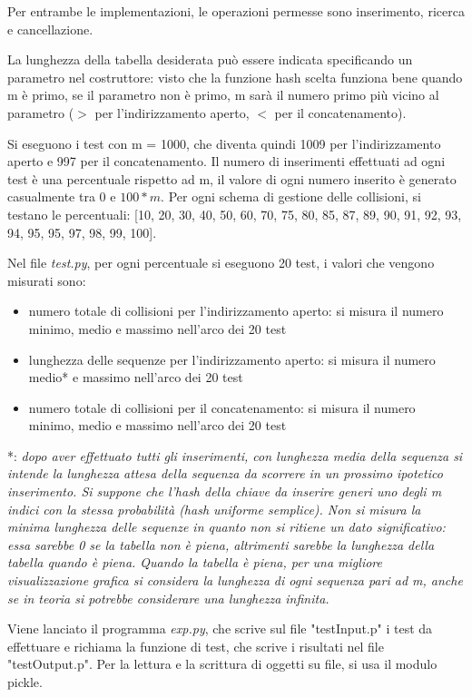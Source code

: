 \documentclass[]{article}
\begin{document}
Per entrambe le implementazioni, le operazioni permesse sono inserimento, ricerca e cancellazione.

La lunghezza della tabella desiderata può essere indicata specificando un parametro nel costruttore: visto che la funzione hash scelta funziona bene quando m è primo, se il parametro non è primo, m sarà il numero primo più vicino al parametro ($>$ per l'indirizzamento aperto, $<$ per il concatenamento).

Si eseguono i test con m = 1000, che diventa quindi 1009 per l'indirizzamento aperto e 997 per il concatenamento.
Il numero di inserimenti effettuati ad ogni test è una percentuale rispetto ad m, il valore di ogni numero inserito è generato casualmente tra $0$ e $100*m$.
Per ogni schema di gestione delle collisioni, si testano le percentuali: [10, 20, 30, 40, 50, 60, 70, 75, 80, 85, 87, 89, 90, 91, 92, 93, 94, 95, 95, 97, 98, 99, 100].

Nel file \textit{test.py}, per ogni percentuale si eseguono 20 test, i valori che vengono misurati sono:
\begin{itemize}
\item numero totale di collisioni per l'indirizzamento aperto: si misura il numero minimo, medio e massimo nell'arco dei 20 test
\item lunghezza delle sequenze per l'indirizzamento aperto: si misura il numero medio* e massimo nell'arco dei 20 test
\item numero totale di collisioni per il concatenamento: si misura il numero minimo, medio e massimo nell'arco dei 20 test
\end{itemize}

*: \textit{dopo aver effettuato tutti gli inserimenti, con lunghezza media della sequenza si intende la lunghezza attesa della sequenza da scorrere in un prossimo ipotetico inserimento. Si suppone che l'hash della chiave da inserire generi uno degli m indici con la stessa probabilità (hash uniforme semplice). Non si misura la minima lunghezza delle sequenze in quanto non si ritiene un dato significativo: essa sarebbe 0 se la tabella non è piena, altrimenti sarebbe la lunghezza della tabella quando è piena. Quando la tabella è piena, per una migliore visualizzazione grafica si considera la lunghezza di ogni sequenza pari ad m, anche se in teoria si potrebbe considerare una lunghezza infinita.}

Viene lanciato il programma \textit{exp.py}, che scrive sul file "testInput.p" i test da effettuare e richiama la funzione di test, che scrive i risultati nel file "testOutput.p". Per la lettura e la scrittura di oggetti su file, si usa il modulo pickle.
\end{document}
